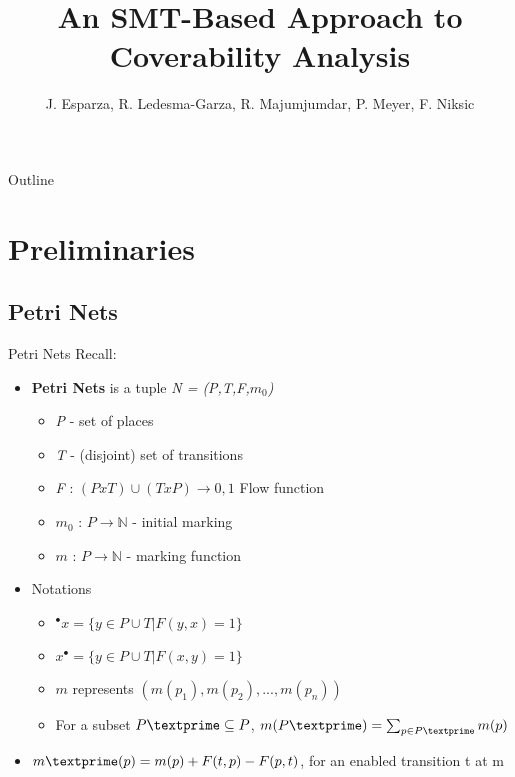 \documentclass{beamer}
\title{An SMT-Based Approach to Coverability Analysis}
\subtitle{}
\author{J. Esparza, R. Ledesma-Garza, R.  Majumjumdar, P. Meyer, F. Niksic }
\begin{document}
\begin{frame}
  \titlepage
\end{frame}

\begin{frame}{Outline}
  \tableofcontents
\end{frame}

\section{Preliminaries}

\subsection{Petri Nets} %

\begin{frame}{Petri Nets}
  Recall:
  \begin{itemize}
  \item \textbf{Petri Nets} is a tuple \textit{N = (P,T,F,$m_0$)}
    \begin{itemize}
       \item \textit{P} - set of places 
       \item \textit{T} - (disjoint) set of transitions
       \item \textit{F} : $(PxT)\cup(TxP) \rightarrow  {0,1} $ Flow function
       \item $m_0$    : $P \rightarrow  \mathbb{N} $ - initial marking
       \item $m$        : $P \rightarrow \mathbb{N} $ - marking function
     \end{itemize}
  \item Notations
    \begin{itemize}
      \item ${}^\bullet x = \{y \in P \cup T | F(y,x) = 1\}$
      \item $x^\bullet = \{y \in P \cup T | F(x,y) = 1\}$
      \item $m$ represents $ (m(p_1),m(p_2),...,m(p_n) )$
      \item For a subset $P\textprime \subseteq P$, $m(P\textprime) = \sum_{p\in P\textprime} m(p) $

    \end{itemize}
  \item $m\textprime(p) = m(p) + F(t,p) - F(p,t)$, for an enabled transition t at m
  \end{itemize}
\end{frame}
\end{document}
